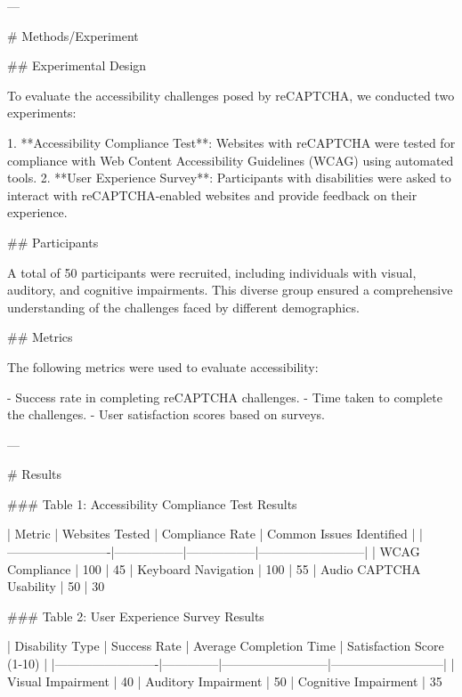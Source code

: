 ---

# Methods/Experiment

## Experimental Design

To evaluate the accessibility challenges posed by reCAPTCHA, we conducted two experiments:

1. **Accessibility Compliance Test**: Websites with reCAPTCHA were tested for compliance with Web Content Accessibility Guidelines (WCAG) using automated tools.
2. **User Experience Survey**: Participants with disabilities were asked to interact with reCAPTCHA-enabled websites and provide feedback on their experience.

## Participants

A total of 50 participants were recruited, including individuals with visual, auditory, and cognitive impairments. This diverse group ensured a comprehensive understanding of the challenges faced by different demographics.

## Metrics

The following metrics were used to evaluate accessibility:

- Success rate in completing reCAPTCHA challenges.
- Time taken to complete the challenges.
- User satisfaction scores based on surveys.

---

# Results

### Table 1: Accessibility Compliance Test Results

| Metric                  | Websites Tested | Compliance Rate | Common Issues Identified |
|-------------------------|-----------------|-----------------|--------------------------|
| WCAG Compliance         | 100             | 45%
| Keyboard Navigation     | 100             | 55%
| Audio CAPTCHA Usability | 50              | 30%

### Table 2: User Experience Survey Results

| Disability Type         | Success Rate | Average Completion Time | Satisfaction Score (1-10) |
|-------------------------|--------------|--------------------------|---------------------------|
| Visual Impairment       | 40%
| Auditory Impairment     | 50%
| Cognitive Impairment    | 35%

